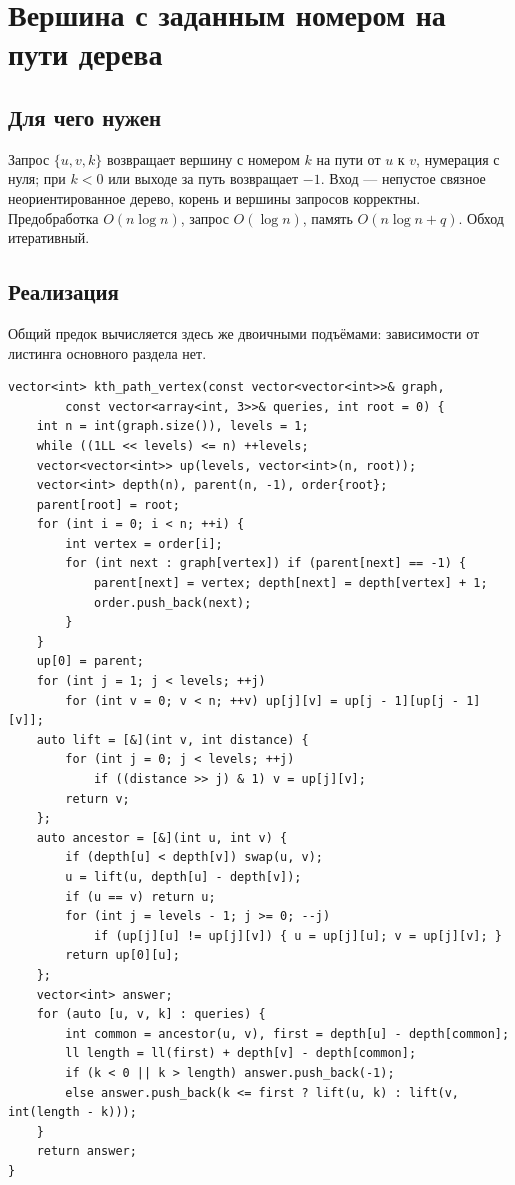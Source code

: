 \clearpage

\fi
\iffalse
\section{Вершина с заданным номером на пути дерева}
\subsection*{Для чего нужен}
Запрос $\{u,v,k\}$ возвращает вершину с номером $k$ на пути от $u$ к $v$,
нумерация с нуля; при $k<0$ или выходе за путь возвращает $-1$.
Вход --- непустое связное неориентированное дерево, корень и вершины
запросов корректны. Предобработка $O(n\log n)$, запрос $O(\log n)$,
память $O(n\log n+q)$. Обход итеративный.
\subsection*{Реализация}
Общий предок вычисляется здесь же двоичными подъёмами: зависимости
от листинга основного раздела нет.
\begin{lstlisting}[name=supplement_kth_path]
vector<int> kth_path_vertex(const vector<vector<int>>& graph,
        const vector<array<int, 3>>& queries, int root = 0) {
    int n = int(graph.size()), levels = 1;
    while ((1LL << levels) <= n) ++levels;
    vector<vector<int>> up(levels, vector<int>(n, root));
    vector<int> depth(n), parent(n, -1), order{root};
    parent[root] = root;
    for (int i = 0; i < n; ++i) {
        int vertex = order[i];
        for (int next : graph[vertex]) if (parent[next] == -1) {
            parent[next] = vertex; depth[next] = depth[vertex] + 1;
            order.push_back(next);
        }
    }
    up[0] = parent;
    for (int j = 1; j < levels; ++j)
        for (int v = 0; v < n; ++v) up[j][v] = up[j - 1][up[j - 1][v]];
    auto lift = [&](int v, int distance) {
        for (int j = 0; j < levels; ++j)
            if ((distance >> j) & 1) v = up[j][v];
        return v;
    };
    auto ancestor = [&](int u, int v) {
        if (depth[u] < depth[v]) swap(u, v);
        u = lift(u, depth[u] - depth[v]);
        if (u == v) return u;
        for (int j = levels - 1; j >= 0; --j)
            if (up[j][u] != up[j][v]) { u = up[j][u]; v = up[j][v]; }
        return up[0][u];
    };
    vector<int> answer;
    for (auto [u, v, k] : queries) {
        int common = ancestor(u, v), first = depth[u] - depth[common];
        ll length = ll(first) + depth[v] - depth[common];
        if (k < 0 || k > length) answer.push_back(-1);
        else answer.push_back(k <= first ? lift(u, k) : lift(v, int(length - k)));
    }
    return answer;
}
\end{lstlisting}
